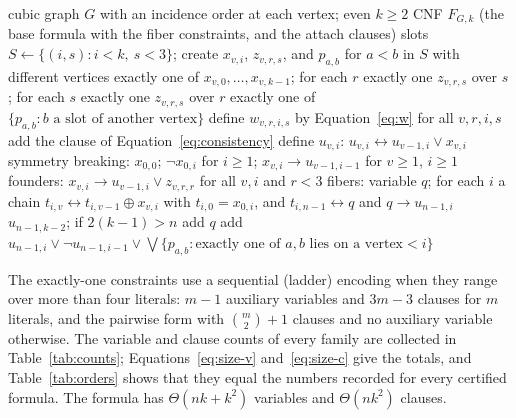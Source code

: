 \documentclass[11pt]{article}
\theoremstyle{definition}
\theoremstyle{remark}
\begin{document}
\begin{algorithm}[t]
\caption{Construction of the formula $F_{G,k}$ for a cubic graph $G$ with vertices $0, \dots, n-1$ and an even target order $k \ge 2$. Exactly-one constraints over $m > 4$ literals use the sequential ladder ($m-1$ auxiliary variables, $3m-3$ clauses) and the pairwise form otherwise; $u_{-1,i}$ is the constant false.}\label{alg:formula}
\begin{algorithmic}[1]
\Require cubic graph $G$ with an incidence order at each vertex; even $k \ge 2$
\Ensure CNF $F_{G,k}$ (the base formula with the fiber constraints, and the attach clauses)
\State slots $S \gets \{(i,s) : i < k,\ s < 3\}$; create $x_{v,i}$, $z_{v,r,s}$, and $p_{a,b}$ for $a < b$ in $S$ with different vertices
  \State exactly one of $x_{v,0}, \dots, x_{v,k-1}$; for each $r$ exactly one $z_{v,r,s}$ over $s$; for each $s$ exactly one $z_{v,r,s}$ over $r$
\EndFor
{}
  \State exactly one of $\{p_{a,b} : b \text{ a slot of another vertex}\}$
\EndFor
\State define $w_{v,r,i,s}$ by Equation~\eqref{eq:w} for all $v, r, i, s$
  \State add the clause of Equation~\eqref{eq:consistency}
\EndFor
\State define $u_{v,i}$: $u_{v,i} \leftrightarrow u_{v-1,i} \vee x_{v,i}$ 
\State symmetry breaking: $x_{0,0}$; $\neg x_{0,i}$ for $i \ge 1$; $x_{v,i} \to u_{v-1,i-1}$ for $v \ge 1$, $i \ge 1$
\State founders: $x_{v,i} \to u_{v-1,i} \vee z_{v,r,r}$ for all $v, i$ and $r < 3$
\State fibers: variable $q$; for each $i$ a chain $t_{i,v} \leftrightarrow t_{i,v-1} \oplus x_{v,i}$ with $t_{i,0} = x_{0,i}$, and $t_{i,n-1} \leftrightarrow q$ and $q \to u_{n-1,i}$
\State $u_{n-1,k-2}$; if $2(k-1) > n$ add $q$
 
  \State add $u_{n-1,i} \vee \neg u_{n-1,i-1} \vee \bigvee \{p_{a,b} : \text{exactly one of } a, b \text{ lies on a vertex} < i\}$
\EndFor
\end{algorithmic}
\end{algorithm}

The exactly-one constraints use a sequential (ladder) encoding when they range over more than four literals: $m-1$ auxiliary variables and $3m-3$ clauses
for $m$ literals, and the pairwise form with $\binom m2 + 1$ clauses and no auxiliary variable otherwise. The variable and clause counts of every family are
collected in Table~\ref{tab:counts}; Equations~\eqref{eq:size-v} and~\eqref{eq:size-c} give the totals, and Table~\ref{tab:orders} shows that they equal the
numbers recorded for every certified formula. The formula has $\Theta(nk + k^2)$ variables and $\Theta(nk^2)$ clauses.
\end{document}
